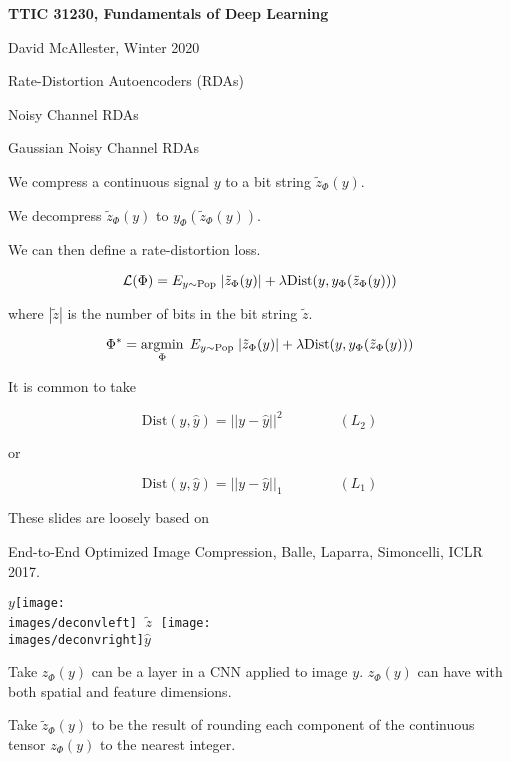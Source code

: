 





{\Huge

  \centerline{\bf TTIC 31230, Fundamentals of Deep Learning}
  \bigskip
  \centerline{David McAllester, Winter 2020}
  \vfill
  \centerline{Rate-Distortion Autoencoders (RDAs)}
  \vfill
  \centerline{Noisy Channel RDAs}
  \vfill
  \centerline{Gaussian Noisy Channel RDAs}


We compress a continuous signal $y$ to a bit string $\tilde{z}_\Phi(y)$.

\vfill
We decompress $\tilde{z}_\Phi(y)$ to $y_\Phi(\tilde{z}_\Phi(y))$.

\vfill
We can then define a rate-distortion loss.

{\color{red} $${\cal L}(\Phi) = E_{y \sim \mathrm{Pop}}\;|\tilde{z}_\Phi(y)| + \lambda \mathrm{Dist}(y,y_\Phi(\tilde{z}_\Phi(y)))$$}

\vfill
where $|\tilde{z}|$ is the number of bits in the bit string $\tilde{z}$.


$$\Phi^* = \operatorname*{argmin}_\Phi\;E_{y \sim \mathrm{Pop}}\;|\tilde{z}_\Phi(y)| + \lambda \mathrm{Dist}(y,y_\Phi(\tilde{z}_\Phi(y)))$$

\vfill
It is common to take

$$\mathrm{Dist}(y,\hat{y}) = ||y-\hat{y}||^2 \hspace{4em}(L_2)$$

\vfill
or

$$\mathrm{Dist}(y,\hat{y}) = ||y-\hat{y}||_1 \hspace{4em} (L_1)$$


These slides are loosely based on

\vfill
End-to-End Optimized Image Compression, Balle, Laparra, Simoncelli, ICLR 2017.


\vfill
\centerline{$y$\texttt{[image: \\images/deconvleft]} $\;\tilde{z}\;$ \texttt{[image: \\images/deconvright]}$\hat{y}$}



Take $z_\Phi(y)$ can be a layer in a CNN applied to image $y$.  $z_\Phi(y)$ can have with both spatial and feature dimensions.

\vfill
Take $\tilde{z}_\Phi(y)$ to be the result of rounding each component of the continuous tensor $z_\Phi(y)$ to the nearest integer.

}
